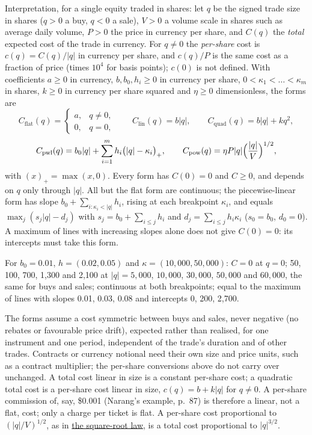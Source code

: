 \begin{qfmodel}
 Interpretation, for a single equity traded in shares: let $q$ be the signed trade size in shares ($q>0$ a buy, $q<0$ a sale), $V>0$ a volume scale in shares such as average daily volume, $P>0$ the price in currency per share, and $C(q)$ the \emph{total} expected cost of the trade in currency. For $q\neq0$ the \emph{per-share} cost is $c(q)=C(q)/\lvert q\rvert$ in currency per share, and $c(q)/P$ is the same cost as a fraction of price (times $10^4$ for basis points); $c(0)$ is not defined. With coefficients $a\ge0$ in currency, $b,b_0,h_i\ge0$ in currency per share, $0<\kappa_1<\dots<\kappa_m$ in shares, $k\ge0$ in currency per share squared and $\eta\ge0$ dimensionless, the forms are
\[ C_{\mathrm{flat}}(q)=\begin{cases}a,&q\neq0,\\0,&q=0,\end{cases}\qquad C_{\mathrm{lin}}(q)=b\lvert q\rvert,\qquad C_{\mathrm{quad}}(q)=b\lvert q\rvert+kq^2, \]
\[ C_{\mathrm{pwl}}(q)=b_0\lvert q\rvert+\sum_{i=1}^{m}h_i\bigl(\lvert q\rvert-\kappa_i\bigr)_{+},\qquad C_{\mathrm{pow}}(q)=\eta P\lvert q\rvert\Bigl(\frac{\lvert q\rvert}{V}\Bigr)^{1/2}, \]
with $(x)_+=\max(x,0)$. Every form has $C(0)=0$ and $C\ge0$, and depends on $q$ only through $\lvert q\rvert$. All but the flat form are continuous; the piecewise-linear form has slope $b_0+\sum_{i:\kappa_i<\lvert q\rvert}h_i$, rising at each breakpoint $\kappa_i$, and equals $\max_j(s_j\lvert q\rvert-d_j)$ with $s_j=b_0+\sum_{i\le j}h_i$ and $d_j=\sum_{i\le j}h_i\kappa_i$ ($s_0=b_0$, $d_0=0$). A maximum of lines with increasing slopes alone does not give $C(0)=0$: its intercepts must take this form.

For $b_0=0.01$, $h=(0.02,0.05)$ and $\kappa=(10{,}000,50{,}000)$: $C=0$ at $q=0$; 50, 100, 700, 1{,}300 and 2{,}100 at $\lvert q\rvert=5{,}000$, $10{,}000$, $30{,}000$, $50{,}000$ and $60{,}000$, the same for buys and sales; continuous at both breakpoints; equal to the maximum of lines with slopes 0.01, 0.03, 0.08 and intercepts 0, 200, 2{,}700.

The forms assume a cost symmetric between buys and sales, never negative (no rebates or favourable price drift), expected rather than realised, for one instrument and one period, independent of the trade's duration and of other trades. Contracts or currency notional need their own size and price units, such as a contract multiplier; the per-share conversions above do not carry over unchanged.
A total cost linear in size is a constant per-share cost; a quadratic total cost is a per-share cost linear in size, $c(q)=b+k\lvert q\rvert$ for $q\neq0$. A per-share commission of, say, \$0.001 (Narang's example, p.~87) is therefore a linear, not a flat, cost; only a charge per ticket is flat. A per-share cost proportional to $(\lvert q\rvert/V)^{1/2}$, as in \hyperref[ev:square-root-impact]{the square-root law}, is a total cost proportional to $\lvert q\rvert^{3/2}$.


\end{qfmodel}
